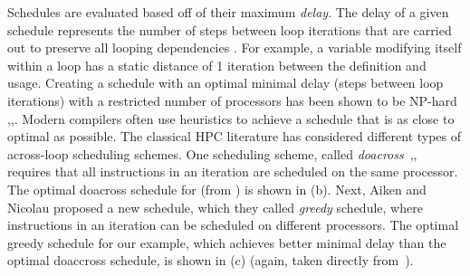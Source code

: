 Schedules are evaluated based off of their maximum \emph{delay}. The delay of a given 
schedule represents the number of steps between loop iterations that are 
carried out to preserve all looping dependencies \cite{Aiken1988}. 
For example, a variable modifying itself within a loop has a static distance of 1
iteration between the definition and usage. Creating a schedule with an optimal minimal delay
(steps between loop iterations) with a restricted number of processors has been shown to be
NP-hard \cite{Cytron1984},\cite{Graham1971},\cite{Darte2000}. 
Modern compilers often use heuristics to achieve a schedule
that is as close to optimal as possible. The classical HPC literature 
has considered different types of across-loop scheduling schemes. 
One scheduling scheme, called \emph{doacross}~\cite{Aiken1988},\cite{Cytron1986}, requires that all instructions in an 
iteration are scheduled on the same processor. 
The optimal doacross schedule for  (from \cite{Aiken1988}) is shown in  (b). 
Next, Aiken and Nicolau \cite{Aiken1988} proposed a new schedule, which they called
\emph{greedy} schedule, where instructions in an iteration can be scheduled on different processors. 
The optimal greedy schedule for our example, which achieves better minimal delay than the optimal 
doaccross schedule, is shown in (c) (again, taken directly from~\cite{Aiken1988}). 

